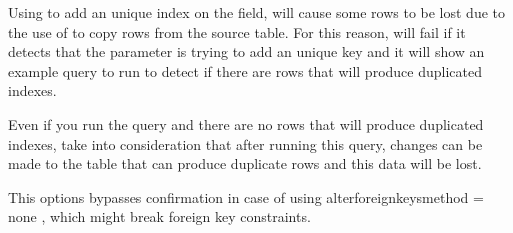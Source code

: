 \documentclass[letterpaper,10pt,english]{sphinxmanual}
\begin{document}
\begin{fulllineitems}
Using  to add an unique index on the  field, will cause some rows to
be lost due to the use of  to copy rows from the source table.
For this reason,  will fail if it detects that the {\hyperref[\detokenize{mariadb-schema-change:cmdoption-mariadb-schema-change-alter}]{}} parameter is trying
to add an unique key and it will show an example query to run to detect if there are
rows that will produce duplicated indexes.

Even if you run the query and there are no rows that will produce duplicated indexes,
take into consideration that after running this query, changes can be made to the table that can produce
duplicate rows and this data will be lost.

\end{fulllineitems}


\begin{fulllineitems}
\label{\detokenize{mariadb-schema-change:cmdoption-mariadb-schema-change-force}}
This options bypasses confirmation in case of using alter\sphinxhyphen{}foreign\sphinxhyphen{}keys\sphinxhyphen{}method = none , which might break foreign key constraints.

\end{fulllineitems}

\end{document}
